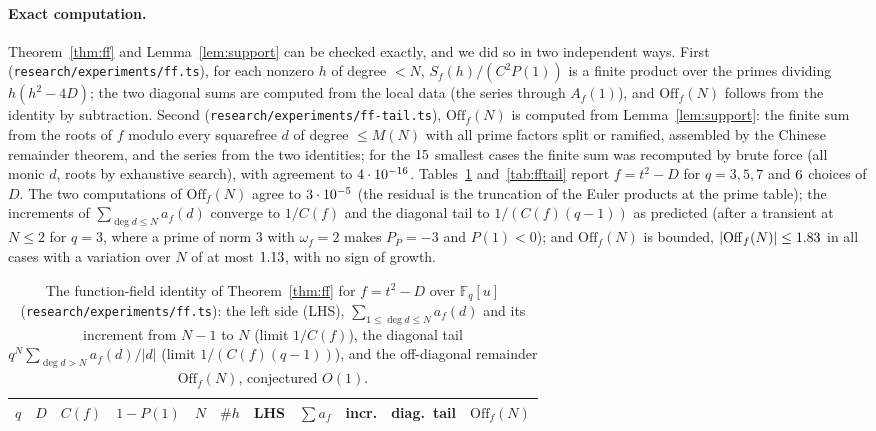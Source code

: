 \documentclass[11pt,a4paper]{article}
\theoremstyle{remark}\newtheorem{remark}[theorem]{Remark}
\newcommand{\F}{\mathbb{F}}
\begin{document}
\paragraph{Exact computation.} Theorem~\ref{thm:ff} and Lemma~\ref{lem:support} can be checked exactly,
and we did so in two independent ways. First (\texttt{research/experiments/ff.ts}), for each nonzero $h$ of degree $<N$,
$S_f(h)/(C^2P(1))$ is a finite product over the primes dividing $h(h^2-4D)$; the two diagonal sums are
computed from the local data (the series through $A_f(1)$), and $\mathrm{Off}_f(N)$ follows from the
identity by subtraction. Second (\texttt{research/experiments/ff-tail.ts}), $\mathrm{Off}_f(N)$ is computed from
Lemma~\ref{lem:support}: the finite sum from the roots of $f$ modulo every squarefree $d$ of degree
$\le M(N)$ with all prime factors split or ramified, assembled by the Chinese remainder theorem, and the
series from the two identities; for the $15$ smallest cases the finite sum was recomputed by
brute force (all monic $d$, roots by exhaustive search), with agreement to $4\cdot10^{-16}$.
Tables~\ref{tab:ff} and~\ref{tab:fftail} report $f=t^2-D$ for $q=3,5,7$ and $6$ choices of $D$.
The two computations of $\mathrm{Off}_f(N)$ agree to $3\cdot10^{-5}$ (the residual is the truncation of
the Euler products at the prime table); the increments of $\sum_{\deg d\le N}a_f(d)$ converge to
$1/C(f)$ and the diagonal tail to $1/(C(f)(q-1))$ as predicted (after a transient at $N\le2$ for $q=3$,
where a prime of norm $3$ with $\omega_f=2$ makes $P_P=-3$ and $P(1)<0$); and $\mathrm{Off}_f(N)$ is
bounded, $|\mathrm{Off}_f(N)|\le1.83$ in all cases with a variation over $N$ of at most
$1.13$, with no sign of growth.

\begin{table}[htbp]
\centering\footnotesize\setlength{\tabcolsep}{4pt}
\caption{The function-field identity of Theorem~\ref{thm:ff} for $f=t^2-D$ over $\F_q[u]$
(\texttt{research/experiments/ff.ts}): the left side (LHS), $\sum_{1\le\deg d\le N}a_f(d)$ and its increment from $N-1$
to $N$ (limit $1/C(f)$), the diagonal tail $q^N\sum_{\deg d>N}a_f(d)/|d|$ (limit $1/(C(f)(q-1))$), and
the off-diagonal remainder $\mathrm{Off}_f(N)$, conjectured $O(1)$.}\label{tab:ff}
\begin{tabular}{rlrrrrrrrrr}
\toprule
$q$ & $D$ & $C(f)$ & $1-P(1)$ & $N$ & $\#h$ & LHS & $\sum a_f$ & incr. & diag.\ tail & $\mathrm{Off}_f(N)$\\
\midrule

\end{tabular}
\end{table}
\end{document}
